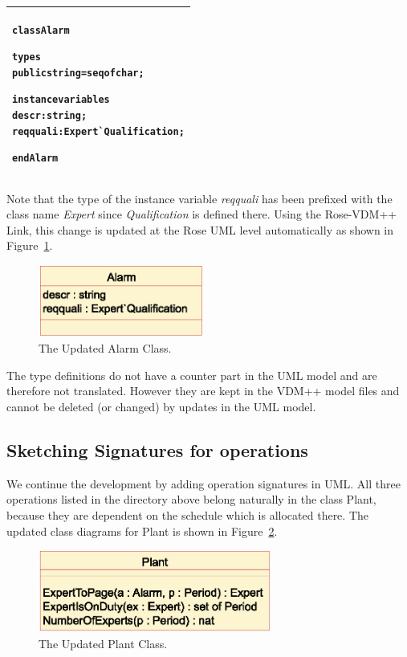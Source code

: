 \documentclass[\pformat,12pt,twoside]{article}
\newenvironment{VDMgray}%
{\begin{tabular}{|G|}\hline\small\begin{alltt}}%
{\end{alltt}\normalsize\\
 \hline\end{tabular}}
\begin{document}
\begin{VDMgray}
class Alarm

types
 public string = seq of char;

instance variables 
 descr : string;
 reqquali : Expert\`{}Qualification;

end Alarm
\end{VDMgray}


Note that the type of the instance variable \emph{reqquali} has been
prefixed with the class name \emph{Expert} since \emph{Qualification}
is defined there. Using the Rose-VDM++ Link, this change is updated at
the Rose UML level automatically as shown in Figure~\ref{fig:updatedalarm}.

\begin{figure}[htbp]
\begin{center}
\includegraphics[width=2.120in]{updatedalarm}
\caption{The Updated Alarm Class.\label{fig:updatedalarm}}
\end{center}
\end{figure}

The type definitions do not have a counter part in the UML model 
and are therefore not translated. However they are kept in the 
VDM++ model files and cannot be deleted (or changed) by updates 
in the UML model.

\subsection{Sketching Signatures for operations}

We continue the development by adding operation signatures in 
UML. All three operations listed in the directory above belong 
naturally in the class Plant, because they are dependent on the 
schedule which is allocated there.
The updated class diagrams for Plant is shown in Figure~\ref{fig:updatedplant}.

\begin{figure}[htbp]
\begin{center}
\includegraphics[width=3in]{updatedplant}
\caption{The Updated Plant Class.\label{fig:updatedplant}}
\end{center}
\end{figure}
\end{document}
